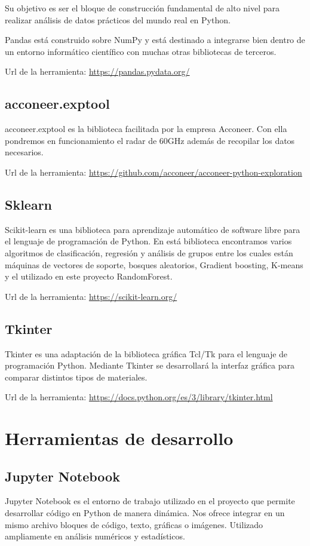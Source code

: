 Su objetivo es ser el bloque de construcción fundamental de alto nivel para realizar análisis de datos prácticos del mundo real en Python.

Pandas está construido sobre NumPy y está destinado a integrarse bien dentro de un entorno informático científico con muchas otras bibliotecas de terceros.

Url de la herramienta: \url{https://pandas.pydata.org/}

\subsection{acconeer.exptool}
acconeer.exptool es la biblioteca facilitada por la empresa Acconeer. Con ella pondremos en funcionamiento el radar de 60GHz además de recopilar los datos necesarios.

Url de la herramienta: \url{https://github.com/acconeer/acconeer-python-exploration}

\subsection{Sklearn}
Scikit-learn es una biblioteca para aprendizaje automático de software libre para el lenguaje de programación de Python.
En está biblioteca encontramos varios algoritmos de clasificación, regresión y análisis de grupos entre los cuales están máquinas de vectores de soporte, bosques aleatorios, Gradient boosting, K-means y el utilizado en este proyecto RandomForest.

Url de la herramienta: \url{https://scikit-learn.org/}

\subsection{Tkinter}
Tkinter es una adaptación de la biblioteca gráfica Tcl/Tk \cite{Tcl} para el lenguaje de programación Python. Mediante Tkinter se desarrollará la interfaz gráfica para comparar distintos tipos de materiales.

Url de la herramienta: \url{https://docs.python.org/es/3/library/tkinter.html}

\section{Herramientas de desarrollo}
\subsection{Jupyter Notebook}
Jupyter Notebook es el entorno de trabajo utilizado en el proyecto que permite desarrollar código en Python de manera dinámica. Nos ofrece integrar en un mismo archivo bloques de código, texto, gráficas o imágenes. Utilizado ampliamente en análisis numéricos y estadísticos.

